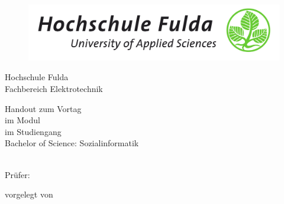 \begin{titlepage}
\begin{figure}
  \centering
  \includegraphics[width=1.0\textwidth]{res/hs_fulda_logo.png}
\end{figure}
    \centering
    Hochschule Fulda \\    Fachbereich Elektrotechnik
    \vspace{1.5cm}

    {\Huge \bfseries \titel \par}
    {\Large \itshape \untertitel \par}
    \vspace{2.5cm}

    Handout zum Vortag\\ im Modul
    \modulname\\
    im Studiengang\\ Bachelor of Science: Sozialinformatik \\
    \vspace{0.7cm}

    \semester\\

    \vspace{3cm}
    Prüfer: \pruefer\\

    \vfill

    vorgelegt von \\ \beteiligte \\ \emailadresse 
\restoregeometry
\end{titlepage}
